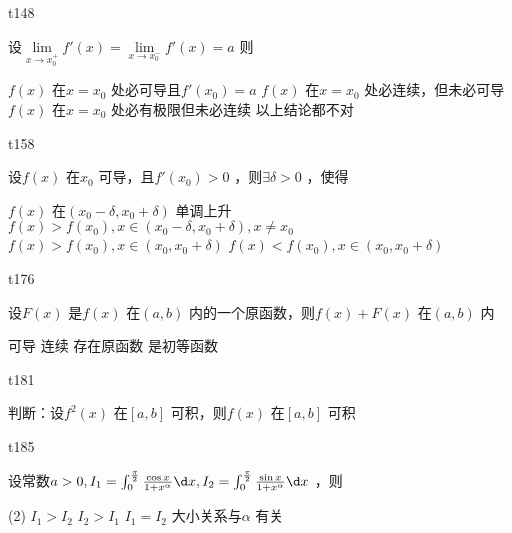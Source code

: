 \begin{question}
    t148

    设$ \lim\limits_{x \to x_0^+} f'(x) = \lim\limits_{x \to x_0^-} f'(x) = a $ 则
    \begin{tasks}
        \task $ f(x) $ 在$ x = x_0 $ 处必可导且$ f'(x_0) = a $ 
        \task $ f(x) $ 在$ x = x_0 $ 处必连续，但未必可导
        \task $ f(x) $ 在$ x = x_0 $ 处必有极限但未必连续
        \task 以上结论都不对
    \end{tasks}
\end{question}

\begin{question}
    t158

    设$ f(x) $ 在$ x_0 $ 可导，且$ f'(x_0) > 0 $ ，则$ \exists \delta > 0 $ ，使得
    \begin{tasks}
        \task   $ f(x) $ 在$ (x_0 - \delta, x_0 + \delta) $ 单调上升
        \task   $ f(x) > f(x_0), x \in (x_0 - \delta, x_0 + \delta), x \neq x_0 $ 
        \task   $ f(x) > f(x_0), x \in (x_0, x_0 + \delta) $ 
        \task   $ f(x) < f(x_0), x \in (x_0, x_0 + \delta) $
    \end{tasks}
\end{question}

\begin{question}
    t176

    设$ F(x) $ 是$ f(x) $ 在$ (a,b) $ 内的一个原函数，则$ f(x) + F(x) $ 在$ (a,b) $ 内
    \begin{tasks}
        \task   可导
        \task   连续
        \task   存在原函数
        \task   是初等函数
    \end{tasks}
\end{question}

\begin{question}
    t181

    判断：设$ f^2(x) $ 在$ [a,b] $ 可积，则$ f(x) $ 在$ [a,b] $ 可积
\end{question}

\begin{question}
    t185

    设常数$ a > 0, I_1 = \int_{0}^{\frac{\pi}{2}} \frac{\cos x}{1 + x^{\alpha}} \d x, I_2 = \int_{0}^{\frac{\pi}{2}} \frac{\sin x}{1 + x^{\alpha}} \d x $ ，则
    \begin{tasks}(2)
        \task   $ I_1 > I_2 $ 
        \task   $ I_2 > I_1 $ 
        \task   $ I_1 = I_2 $ 
        \task   大小关系与$ \alpha $ 有关
    \end{tasks}
\end{question}

